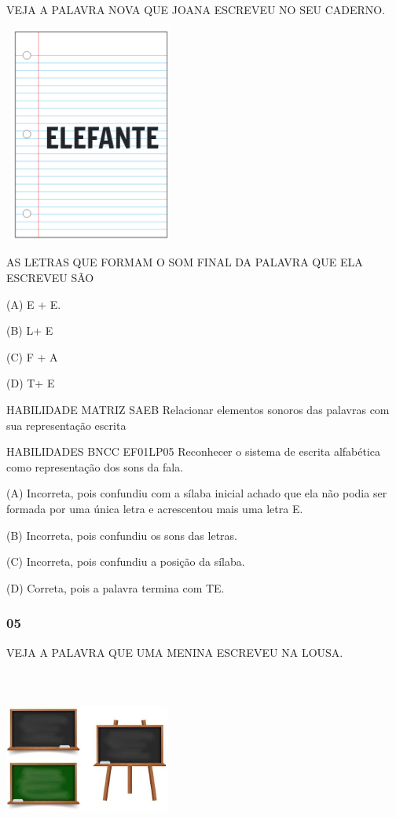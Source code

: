 VEJA A PALAVRA NOVA QUE JOANA ESCREVEU NO SEU CADERNO.

\includegraphics[width=2.24931in,height=2.80435in]{media/image230.png}

AS LETRAS QUE FORMAM O SOM FINAL DA PALAVRA QUE ELA ESCREVEU SÃO

(A) E + E.

(B) L+ E

(C) F + A

(D) T+ E

HABILIDADE MATRIZ SAEB Relacionar elementos sonoros das palavras com sua
representação escrita

HABILIDADES BNCC EF01LP05 Reconhecer o sistema de escrita alfabética
como representação dos sons da fala.

(A) Incorreta, pois confundiu com a sílaba inicial achado que ela não
podia ser formada por uma única letra e acrescentou mais uma letra E.

(B) Incorreta, pois confundiu os sons das letras.

(C) Incorreta, pois confundiu a posição da sílaba.

(D) Correta, pois a palavra termina com TE.

\subsubsection{05}\label{section-61}

VEJA A PALAVRA QUE UMA MENINA ESCREVEU NA LOUSA.

\includegraphics[width=2.13044in,height=2.33234in]{media/image231.jpg}

